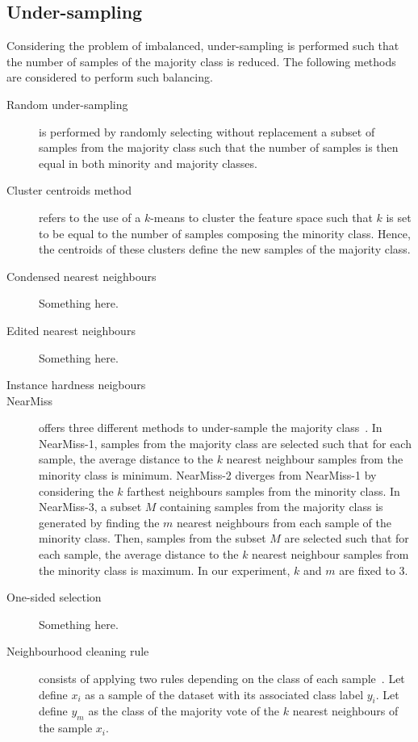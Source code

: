 \documentclass[twoside,11pt]{article}
\begin{document}
\subsection{Under-sampling}

Considering the problem of imbalanced, under-sampling is performed such that the number of samples of the majority class is reduced.
The following methods are considered to perform such balancing.

\begin{description}
  \item[Random under-sampling] is performed by randomly selecting without replacement a subset of samples from the majority class such that the number of samples is then equal in both minority and majority classes.
  \item[Cluster centroids method] refers to the use of a $k$-means to cluster the feature space such that $k$ is set to be equal to the number of samples composing the minority class.
Hence, the centroids of these clusters define the new samples of the majority class. 
  \item[Condensed nearest neighbours] Something here.
  \item[Edited nearest neighbours] Something here.
  \item[Instance hardness neigbours]
  \item[NearMiss] offers three different methods to under-sample the majority class~\cite{mani2003knn}.
In NearMiss-1, samples from the majority class are selected such that for each sample, the average distance to the $k$ nearest neighbour samples from the minority class is minimum.
NearMiss-2 diverges from NearMiss-1 by considering the $k$ farthest neighbours samples from the minority class.
In NearMiss-3, a subset $M$ containing samples from the majority class is generated by finding the $m$ nearest neighbours from each sample of the minority class.
Then, samples from the subset $M$ are selected such that for each sample, the average distance to the $k$ nearest neighbour samples from the minority class is maximum.
In our experiment, $k$ and $m$ are fixed to 3.
  \item[One-sided selection] Something here.
  \item[Neighbourhood cleaning rule] consists of applying two rules depending on the class of each sample~\cite{laurikkala2001improving}.
Let define $x_i$ as a sample of the dataset with its associated class label $y_i$.
Let define $y_m$ as the class of the majority vote of the $k$ nearest neighbours of the sample $x_i$.

\end{description}
\end{document}
